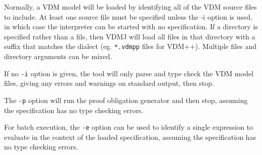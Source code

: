 \documentclass{overturerepchap}
\begin{document}
Normally, a VDM model will be loaded by identifying all of the VDM source files to include. At least
one source file must be specified unless the -i option is used, in which case the interpreter can be
started with no specification. If a directory is specified rather than a file, then VDMJ will load
all files in that directory with a suffix that matches the dialect (eg. \texttt{*.vdmpp} files for VDM++).
Multiple files and directory arguments can be mixed.

If no \texttt{-i} option is given, the tool will only parse and type check
the VDM model files, giving any errors and warnings on
standard output, then stop. 

The \texttt{-p} option will run the proof obligation generator and
then stop, assuming the specification has no type checking errors.

For batch execution, the \texttt{-e} option can be used to identify a
single expression to evaluate in the context of the loaded
specification, assuming the specification has no type checking errors.




\lstset{style=tool,language=}

\end{document}
